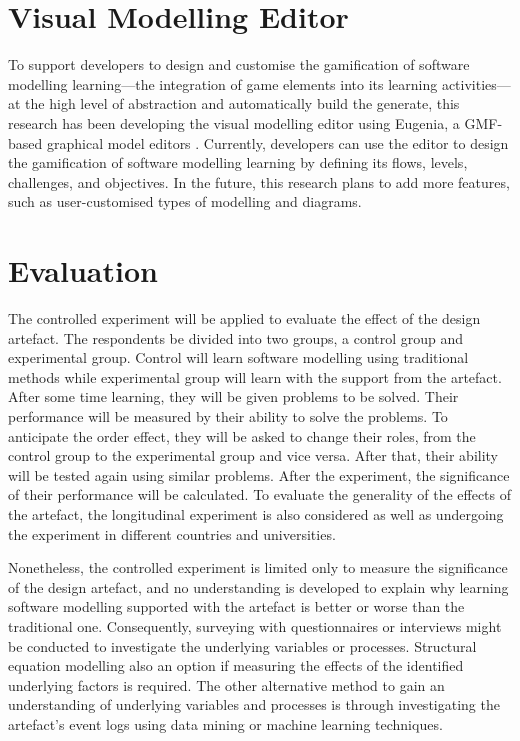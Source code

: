 \documentclass[runningheads,a4paper]{llncs}
\begin{document}
\section{Visual Modelling Editor}
To support developers to design and customise the gamification of software modelling learning---the integration of game elements into its learning activities---at the high level of abstraction and automatically build the generate, this research has been developing the visual modelling editor using Eugenia, a GMF-based graphical model editors \cite{kolovos2015eugenia}. Currently, developers can use the editor to design the gamification of software modelling learning by defining its flows, levels, challenges, and objectives. In the future, this research plans to add more features, such as user-customised types of modelling and diagrams. 

\section{Evaluation}
The controlled experiment will be applied to evaluate the effect of the design artefact. The respondents be divided into two groups, a control group and experimental group. Control will learn software modelling using traditional methods while experimental group will learn with the support from the artefact. After some time learning, they will be given problems to be solved. Their performance will be measured by their ability to solve the problems. To anticipate the order effect, they will be asked to change their roles, from the control group to the experimental group and vice versa. After that, their ability will be tested again using similar problems. After the experiment, the significance of their performance will be calculated. To evaluate the generality of the effects of the artefact, the longitudinal experiment is also considered as well as undergoing the experiment in different countries and universities.

Nonetheless, the controlled experiment is limited only to measure the significance of the design artefact, and no understanding is developed to explain why learning software modelling supported with the artefact is better or worse than the traditional one. Consequently, surveying with questionnaires or interviews might be conducted to investigate the underlying variables or processes. Structural equation modelling also an option if measuring the effects of the identified underlying factors is required. The other alternative method to gain an understanding of underlying variables and processes is through investigating the artefact's event logs using data mining or machine learning techniques.
\end{document}
